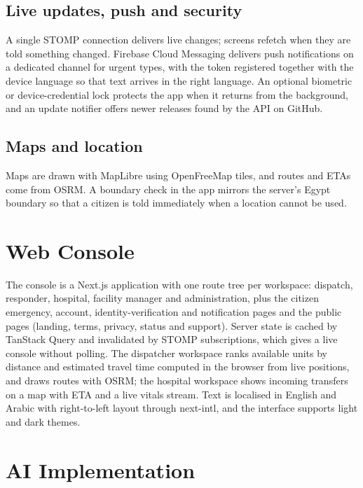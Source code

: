 

\subsection{Live updates, push and security}
A single STOMP connection delivers live changes; screens refetch when they are told something changed. Firebase Cloud
Messaging delivers push notifications on a dedicated channel for urgent types, with the token registered together with the
device language so that text arrives in the right language. An optional biometric or device-credential lock protects the
app when it returns from the background, and an update notifier offers newer releases found by the API on GitHub.

\subsection{Maps and location}
Maps are drawn with MapLibre using OpenFreeMap tiles, and routes and ETAs come from OSRM. A boundary check in the app
mirrors the server's Egypt boundary so that a citizen is told immediately when a location cannot be used.

\section{Web Console}

The console is a Next.js application with one route tree per workspace: dispatch, responder, hospital, facility manager and
administration, plus the citizen emergency, account, identity-verification and notification pages and the public
pages (landing, terms, privacy, status and support). Server state is cached by TanStack Query and invalidated by STOMP
subscriptions, which gives a live console without polling. The dispatcher workspace ranks available units by distance
and estimated travel time computed in the browser from live positions, and draws routes with OSRM; the hospital workspace
shows incoming transfers on a map with ETA and a live vitals stream. Text is localised in English and Arabic with
right-to-left layout through next-intl, and the interface supports light and dark themes.

\section{AI Implementation}

